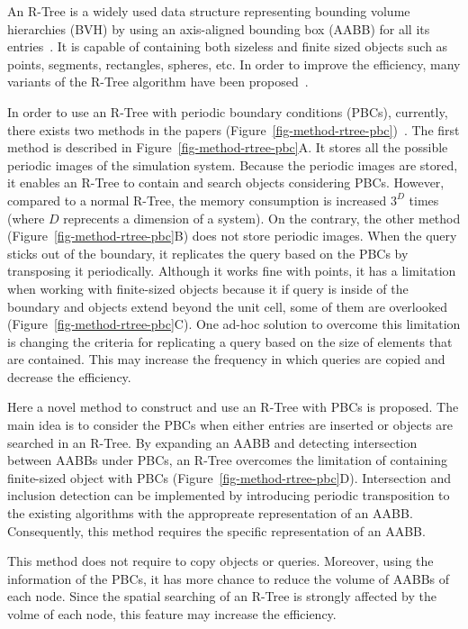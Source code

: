\documentclass[10pt,letterpaper,twocolumn]{article}
\begin{document}
An R-Tree is a widely used data structure representing bounding volume
hierarchies (BVH) by using an axis-aligned bounding box (AABB) for all its
entries~\cite{Guttman1984}.
It is capable of containing both sizeless and finite sized objects such as
points, segments, rectangles, spheres, etc.
In order to improve the efficiency, many variants of the R-Tree algorithm have
been proposed~\cite{Greene1989, Beckmann1990, Leuteneggert1997, Mitsuhashi2016}.

In order to use an R-Tree with periodic boundary conditions (PBCs), currently,
there exists two methods in the papers
(Figure~\ref{fig-method-rtree-pbc})~\cite{Mitsuhashi2016}.
The first method is described in Figure~\ref{fig-method-rtree-pbc}A.
It stores all the possible periodic images of the simulation system.
Because the periodic images are stored, it enables an R-Tree to
contain and search objects considering PBCs.
However, compared to a normal R-Tree, the memory consumption is increased
$3^D$ times (where $D$ reprecents a dimension of a system).
On the contrary, the other method (Figure~\ref{fig-method-rtree-pbc}B)
does not store periodic images.
When the query sticks out of the boundary, it replicates the query based on the
PBCs by transposing it periodically.
Although it works fine with points, it has a limitation when working with
finite-sized objects because it if query is inside of the boundary and objects
extend beyond the unit cell, some of them are overlooked
(Figure~\ref{fig-method-rtree-pbc}C).
One ad-hoc solution to overcome this limitation is changing the criteria for
replicating a query based on the size of elements that are contained.
This may increase the frequency in which queries are copied and decrease the
efficiency.

Here a novel method to construct and use an R-Tree with PBCs is proposed.
The main idea is to consider the PBCs when either entries are inserted or
objects are searched in an R-Tree.
By expanding an AABB and detecting intersection between AABBs under PBCs,
an R-Tree overcomes the limitation of containing finite-sized object with PBCs
(Figure~\ref{fig-method-rtree-pbc}D). Intersection and inclusion detection can be
implemented by introducing periodic transposition to the existing algorithms
with the appropreate representation of an AABB.
Consequently, this method requires the specific representation of an AABB.

This method does not require to copy objects or queries.
Moreover, using the information of the PBCs, it has more chance
to reduce the volume of AABBs of each node. Since the spatial
searching of an R-Tree is strongly affected by the volme of each node,
this feature may increase the efficiency.
\end{document}
